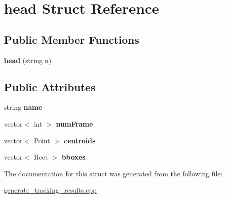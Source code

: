 \hypertarget{structhead}{}\section{head Struct Reference}
\label{structhead}
\subsection*{Public Member Functions}
\begin{DoxyCompactItemize}
\item 
{\bfseries head} (string n)\hypertarget{structhead_ab5cfacecdadf0357559757505f423adc}{}\label{structhead_ab5cfacecdadf0357559757505f423adc}

\end{DoxyCompactItemize}
\subsection*{Public Attributes}
\begin{DoxyCompactItemize}
\item 
string {\bfseries name}\hypertarget{structhead_ab009cd0aa4310046a8839623da913cfd}{}\label{structhead_ab009cd0aa4310046a8839623da913cfd}

\item 
vector$<$ int $>$ {\bfseries num\+Frame}\hypertarget{structhead_a8ddf9fe5e2b34ec2cc8db895f906d7ef}{}\label{structhead_a8ddf9fe5e2b34ec2cc8db895f906d7ef}

\item 
vector$<$ Point $>$ {\bfseries centroids}\hypertarget{structhead_a1d86bc462fdb1127c3662f1ae148e5c7}{}\label{structhead_a1d86bc462fdb1127c3662f1ae148e5c7}

\item 
vector$<$ Rect $>$ {\bfseries bboxes}\hypertarget{structhead_af40218737d4467abbd973cb4fa1f165d}{}\label{structhead_af40218737d4467abbd973cb4fa1f165d}

\end{DoxyCompactItemize}


The documentation for this struct was generated from the following file\+:\begin{DoxyCompactItemize}
\item 
\hyperlink{generate__tracking__results_8cpp}{generate\+\_\+tracking\+\_\+results.\+cpp}\end{DoxyCompactItemize}
